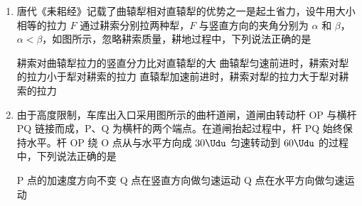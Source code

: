 \documentclass[\gkver]{gaokaozhenti}
\begin{document}
\begin{enumerate}
{	故选 D。
}

\item
唐代《耒耜经》记载了曲辕犁相对直辕犁的优势之一是起土省力，设牛用大小相等的拉力 $F$ 通过耕索分别拉两种犁，$F$ 与竖直方向的夹角分别为 $\alpha$ 和 $\beta$，$\alpha<\beta$，如图所示，忽略耕索质量，耕地过程中，下列说法正确的是 


{耕索对曲辕犁拉力的竖直分力比对直辕犁的大}
{曲辕犁匀速前进时，耕索对犁的拉力小于犁对耕索的拉力}
{直辕犁加速前进时，耕索对犁的拉力大于犁对耕索的拉力}


\item
由于高度限制，车库出入口采用图所示的曲杆道闸，道闸由转动杆 OP 与横杆 PQ 链接而成，P、Q 为横杆的两个端点。在道闸抬起过程中，杆 PQ 始终保持水平。杆 OP 绕 O 点从与水平方向成 $30\Udu$ 匀速转动到 $60\Udu$ 的过程中，下列说法正确的是 


{P 点的加速度方向不变}
{Q 点在竖直方向做匀速运动}
{Q 点在水平方向做匀速运动}

\end{enumerate}
\end{document}
